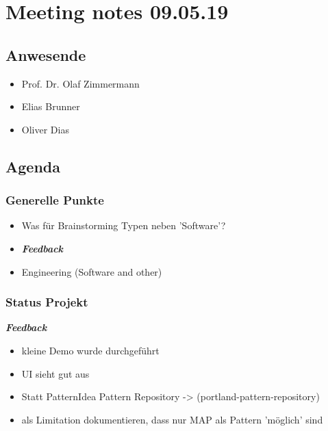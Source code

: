 \hypertarget{meeting-notes-090519}{%
\section*{Meeting notes 09.05.19}\label{meeting-notes-090519}}

\hypertarget{anwesende}{%
\subsection*{Anwesende}\label{anwesende}}

\begin{itemize}
\item
  Prof. Dr. Olaf Zimmermann
\item
  Elias Brunner
\item
  Oliver Dias
\end{itemize}

\hypertarget{agenda}{%
\subsection*{Agenda}\label{agenda}}

\hypertarget{generelle-punkte}{%
\subsubsection*{Generelle Punkte}\label{generelle-punkte}}

\begin{itemize}
\item Was für Brainstorming Typen neben 'Software'?
\item \emph{\textbf{Feedback}}
\item Engineering (Software and other)
\end{itemize}

\hypertarget{status-projekt}{%
\subsubsection*{Status Projekt}\label{status-projekt}}

\emph{\textbf{Feedback}}

\begin{itemize}
\item kleine Demo wurde durchgeführt
\item UI sieht gut aus
\item Statt PatternIdea Pattern Repository -\textgreater{}
  (portland-pattern-repository)
\item als Limitation dokumentieren, dass nur MAP als Pattern 'möglich' sind
\end{itemize}


